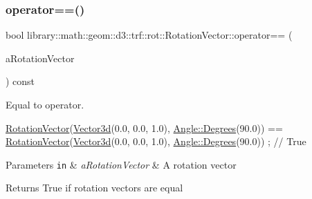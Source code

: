 \subsubsection{\texorpdfstring{operator==()}{operator==()}}
{\footnotesize\ttfamily bool library\+::math\+::geom\+::d3\+::trf\+::rot\+::\+Rotation\+Vector\+::operator== (\begin{DoxyParamCaption}\item[{const \hyperlink{classlibrary_1_1math_1_1geom_1_1d3_1_1trf_1_1rot_1_1_rotation_vector}{Rotation\+Vector} \&}]{a\+Rotation\+Vector }\end{DoxyParamCaption}) const}



Equal to operator. 


\begin{DoxyCode}
\hyperlink{classlibrary_1_1math_1_1geom_1_1d3_1_1trf_1_1rot_1_1_rotation_vector_a49076a279f457fdb14c4a9d4d61e1738}{RotationVector}(\hyperlink{namespacelibrary_1_1math_1_1obj_a977e84e9bf317a4e7dd9d6d671d6da2f}{Vector3d}(0.0, 0.0, 1.0), \hyperlink{classlibrary_1_1math_1_1geom_1_1_angle_a64aa53e8420aeb6f671d86c65c370bc8}{Angle::Degrees}(90.0)) == 
      \hyperlink{classlibrary_1_1math_1_1geom_1_1d3_1_1trf_1_1rot_1_1_rotation_vector_a49076a279f457fdb14c4a9d4d61e1738}{RotationVector}(\hyperlink{namespacelibrary_1_1math_1_1obj_a977e84e9bf317a4e7dd9d6d671d6da2f}{Vector3d}(0.0, 0.0, 1.0), \hyperlink{classlibrary_1_1math_1_1geom_1_1_angle_a64aa53e8420aeb6f671d86c65c370bc8}{Angle::Degrees}(90.0)) ; \textcolor{comment}{// True}
\end{DoxyCode}



\begin{DoxyParams}[1]{Parameters}
\mbox{\tt in}  & {\em a\+Rotation\+Vector} & A rotation vector \\
\hline
\end{DoxyParams}
\begin{DoxyReturn}{Returns}
True if rotation vectors are equal 
\end{DoxyReturn}
\mbox{\label{classlibrary_1_1math_1_1geom_1_1d3_1_1trf_1_1rot_1_1_rotation_vector_a6da4ed18679e28816896de413e04ed79}} 
